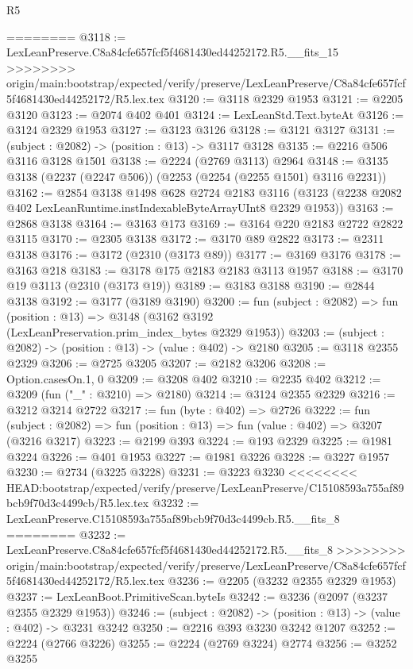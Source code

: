 \begin{lexlean}{R5}
\begin{coremodule}
{{{{{{{{{{{{{{{{{{{{{{{{{{{{{{{{{{{{{{{{{{{{{{{{{{{{{{{{{{{{{{========
@3118 := LexLeanPreserve.C8a84cfe657fcf5f4681430ed44252172.R5.__fits_15
>>>>>>>> origin/main:bootstrap/expected/verify/preserve/LexLeanPreserve/C8a84cfe657fcf5f4681430ed44252172/R5.lex.tex
@3120 := @3118 @2329 @1953
@3121 := @2205 @3120
@3123 := @2074 @402 @401
@3124 := LexLeanStd.Text.byteAt
@3126 := @3124 @2329 @1953
@3127 := @3123 @3126
@3128 := @3121 @3127
@3131 := (subject : @2082) -> (position : @13) -> @3117 @3128
@3135 := @2216 @506 @3116 @3128 @1501
@3138 := @2224 (@2769 @3113) @2964
@3148 := @3135 @3138 (@2237 (@2247 @506)) (@2253 (@2254 (@2255 @1501) @3116 @2231))
@3162 := @2854
    @3138
    @1498
    @628
    @2724
    @2183
    @3116
    (@3123 (@2238 @2082 @402 LexLeanRuntime.instIndexableByteArrayUInt8 @2329 @1953))
@3163 := @2868 @3138
@3164 := @3163 @173
@3169 := @3164 @220 @2183 @2722 @2822 @3115
@3170 := @2305 @3138
@3172 := @3170 @89 @2822
@3173 := @2311 @3138
@3176 := @3172 (@2310 (@3173 @89))
@3177 := @3169 @3176
@3178 := @3163 @218
@3183 := @3178 @175 @2183 @2183 @3113 @1957
@3188 := @3170 @19 @3113 (@2310 (@3173 @19))
@3189 := @3183 @3188
@3190 := @2844 @3138
@3192 := @3177 (@3189 @3190)
@3200 := fun (subject : @2082) =>
  fun (position : @13) => @3148 (@3162 @3192 (LexLeanPreservation.prim_index_bytes @2329 @1953))
@3203 := (subject : @2082) -> (position : @13) -> (value : @402) -> @2180
@3205 := @3118 @2355 @2329
@3206 := @2725 @3205
@3207 := @2182 @3206
@3208 := Option.casesOn.{1, 0}
@3209 := @3208 @402
@3210 := @2235 @402
@3212 := @3209 (fun ("_" : @3210) => @2180)
@3214 := @3124 @2355 @2329
@3216 := @3212 @3214 @2722
@3217 := fun (byte : @402) => @2726
@3222 := fun (subject : @2082) => fun (position : @13) => fun (value : @402) => @3207 (@3216 @3217)
@3223 := @2199 @393
@3224 := @193 @2329
@3225 := @1981 @3224
@3226 := @401 @1953
@3227 := @1981 @3226
@3228 := @3227 @1957
@3230 := @2734 (@3225 @3228)
@3231 := @3223 @3230
<<<<<<<< HEAD:bootstrap/expected/verify/preserve/LexLeanPreserve/C15108593a755af89bcb9f70d3c4499cb/R5.lex.tex
@3232 := LexLeanPreserve.C15108593a755af89bcb9f70d3c4499cb.R5.__fits_8
========
@3232 := LexLeanPreserve.C8a84cfe657fcf5f4681430ed44252172.R5.__fits_8
>>>>>>>> origin/main:bootstrap/expected/verify/preserve/LexLeanPreserve/C8a84cfe657fcf5f4681430ed44252172/R5.lex.tex
@3236 := @2205 (@3232 @2355 @2329 @1953)
@3237 := LexLeanBoot.PrimitiveScan.byteIs
@3242 := @3236 (@2097 (@3237 @2355 @2329 @1953))
@3246 := (subject : @2082) -> (position : @13) -> (value : @402) -> @3231 @3242
@3250 := @2216 @393 @3230 @3242 @1207
@3252 := @2224 (@2766 @3226)
@3255 := @2224 (@2769 @3224) @2774
@3256 := @3252 @3255
}}}}}}}}}}}}}}}}}}}}}}}}}}}}}}}}}}}}}}}}}}}}}}}}}}}}}}}}}}}}}}
\end{coremodule}
\end{lexlean}
